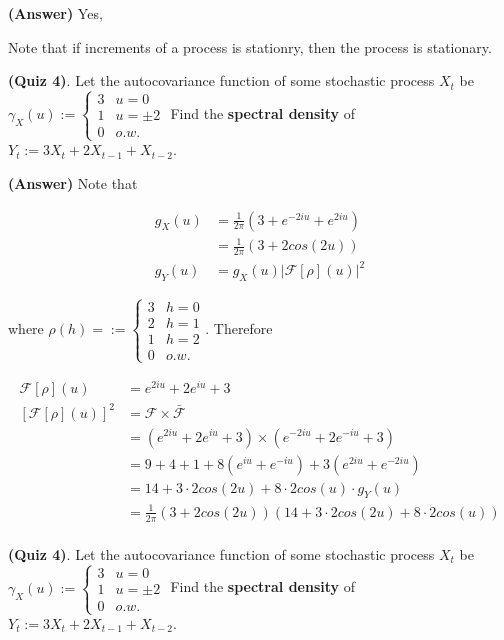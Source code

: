 \documentclass[12pt]{article}
\theoremstyle{nonumberbreak}
\begin{document}
\textbf{(Answer)} Yes,

Note that if increments of a process is stationry, then the process is stationary.



\textbf{(Quiz 4)}. Let the autocovariance function of some stochastic process $X_t$ be $\gamma_X(u) := \begin{cases} 3 & u=0 \\ 1 & u=\pm2 \\ 0 & o.w. \end{cases}$ Find the \textbf{spectral density} of $Y_t := 3X_t + 2X_{t-1} + X_{t-2}$. 

\textbf{(Answer)} Note that 

$$
\begin{aligned}
g_X(u) &= \frac{1}{2\pi} ( 3 + e^{-2iu} + e^{2iu}) \\[8pt]
&= \frac{1}{2\pi} (3 + 2 cos(2u)) \\[10pt]
g_Y(u) &= g_X(u) |\mathcal{F}[\rho] (u)|^2
\end{aligned}
$$

where $\rho(h) = := \begin{cases} 3 & h=0 \\ 2 & h=1 \\ 1 & h=2 \\ 0 & o.w. \end{cases}$. Therefore

$$
\begin{aligned}
\mathcal{F}[\rho] (u) &= e^{2iu} + 2e^{iu} + 3 \\[8pt]
[\mathcal{F}[\rho] (u)]^2 &= \mathcal{F} \times \bar{\mathcal{F}} \\[8pt]
&= (e^{2iu} + 2e^{iu} + 3) \times (e^{-2iu} + 2e^{-iu} + 3) \\[8pt]
&= 9 + 4 + 1 + 8(e^{iu} + e^{-iu}) + 3(e^{2iu} + e^{-2iu}) \\[8pt]
&= 14 + 3\cdot 2cos(2u) + 8\cdot 2 cos(u) \cdot g_Y(u) \\[8pt]
&= \frac{1}{2\pi} (3 + 2cos(2u)) (14 + 3 \cdot 2cos(2u) + 8\cdot 2 cos(u)) \\[8pt]
\end{aligned}
$$



\textbf{(Quiz 4)}. Let the autocovariance function of some stochastic process $X_t$ be $\gamma_X(u) := \begin{cases} 3 & u=0 \\ 1 & u=\pm2 \\ 0 & o.w. \end{cases}$ Find the \textbf{spectral density} of $Y_t := 3X_t + 2X_{t-1} + X_{t-2}$. 
\end{document}
